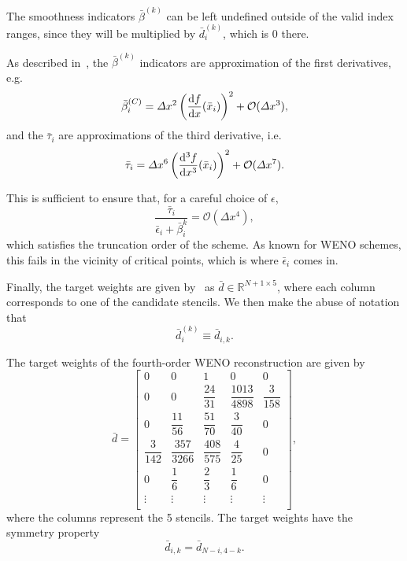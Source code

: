 \documentclass{scrartcl}
\begin{document}
\begin{remark}
    The smoothness indicators $\bar{\beta}^{(k)}$ can be left undefined outside
    of the valid index ranges, since they will be multiplied by $\bar{d}^{(k)}_i$,
    which is $0$ there.
\end{remark}

\begin{remark}
    As described in~\cite{Fisher2011}, the $\bar{\beta}^{(k)}$ indicators are
    approximation of the first derivatives, e.g.
    \[
    \bar{\beta}^{(C)}_i =
        \Delta x^2 \left(\dfrac{\mathrm{d} f}{\mathrm{d} x}(\bar{x}_i)\right)^2
        + \mathcal{O}(\Delta x^3),
    \]
    and the $\bar{\tau}_i$ are approximations of the third derivative, i.e.
    \[
    \bar{\tau}_i =
        \Delta x^6 \left(\dfrac{\mathrm{d} ^3 f}{\mathrm{d} x^3}(\bar{x}_i)\right)^2
        + \mathcal{O}(\Delta x^7).
    \]

    This is sufficient to ensure that, for a careful choice of $\epsilon$,
    \[
    \frac{\bar{\tau}_i}{\bar{\epsilon}_i + \bar{\beta}^{k}_i} =
    \mathcal{O}(\Delta x^4),
    \]
    which satisfies the truncation order of the scheme. As known for WENO schemes,
    this fails in the vicinity of critical points, which is where $\bar{\epsilon}_i$
    comes in.
\end{remark}

Finally, the target weights are given by~\cite[Appendix C.3]{Fisher2011} as
$\bar{d} \in \mathbb{R}^{N + 1 \times 5}$, where each column corresponds to one
of the candidate stencils. We then make the abuse of notation that
\[
\bar{d}^{(k)}_i \equiv \bar{d}_{i, k}.
\]

\begin{definition} \label{def:weno:target_weights}
The target weights of the fourth-order WENO reconstruction are given by
\[
\bar{d} =
\begin{bmatrix}
0 & 0 & 1 & 0 & 0 \\[1em]
0 & 0 & \dfrac{24}{31} & \dfrac{1013}{4898} & \dfrac{3}{158} \\[1em]
0 & \dfrac{11}{56} & \dfrac{51}{70} & \dfrac{3}{40} & 0 \\[1em]
\dfrac{3}{142} & \dfrac{357}{3266} & \dfrac{408}{575} & \dfrac{4}{25} & 0 \\[1em]
0 & \dfrac{1}{6} & \dfrac{2}{3} & \dfrac{1}{6} & 0 \\[1em]
\vdots & \vdots & \vdots & \vdots & \vdots \\[1em]
\end{bmatrix},
\]
where the columns represent the 5 stencils. The target weights have the symmetry
property
\[
\bar{d}_{i, k} = \bar{d}_{N - i, 4 - k}.
\]
\end{definition}
\end{document}
